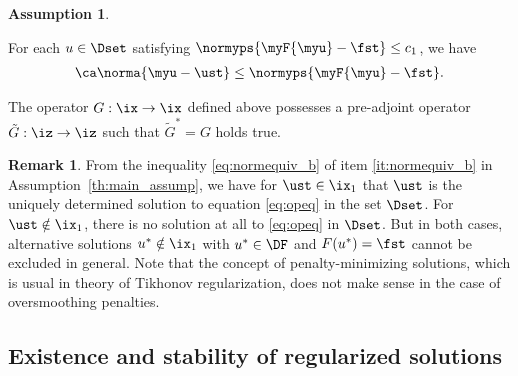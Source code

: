 \documentclass[10pt]{article}
\theoremstyle{definition}
\newtheorem{assumption}[theorem]{Assumption}
\newtheorem{remark}[theorem]{Remark}
\begin{document}
\begin{assumption}
\begin{myenumerate_indent}
\begin{mylist}
\item
For each $ u \in \Dset $ satisfying $ \normyps{\myF{\myu} - \fst} \le c_1 $, we have
\begin{align}
\label{eq:normequiv_b}
\ca\norma{\myu - \ust} \le \normyps{\myF{\myu} - \fst}.
\end{align}
\end{mylist}

\item
\label{it:Gnew}
The operator $G: \ix \to \ix$ defined above possesses a pre-adjoint operator $\tilde G: \iz \to \iz$ such that $\tilde G^*=G$ holds true.


\end{myenumerate_indent}
\end{assumption}
%
\begin{comment}
\begin{remark} \label{th:rem-assump}
Items \ref{it:G-compact} and
Item \ref{it:G-preadjoint} are needed for the proof our version of well-posedness (existence and stability of regularized solutions in the norm of $ \ix $) in the sense of Theorem \ref{th:tifu-well-posed} below. Note that the preadjoint operator $\tilde G $ is necessarily also compact, see, e.g.,
\cite{Yosida[80]}.
\end{remark}
\end{comment}
\begin{remark} \label{rem:rem1}
From the inequality \eqref{eq:normequiv_b} of item \ref{it:normequiv_b} in Assumption~\ref{th:main_assump}, we have for $\ust \in \ix_1$ that $\ust$ is the uniquely determined solution to equation \eqref{eq:opeq} in the set $\Dset$. For $\ust \notin \ix_1$, there is no solution at all to \eqref{eq:opeq} in $\Dset$. But in both cases, alternative solutions $u^* \notin \ix_1$ with $u^* \in \DF$ and $F(u^*)=\fst$ cannot be excluded in general. Note that the concept of penalty-minimizing solutions, which is usual in theory of Tikhonov regularization, does not make sense in the
case of oversmoothing penalties.
\end{remark}

\subsection{Existence and stability of regularized solutions}
\end{document}

